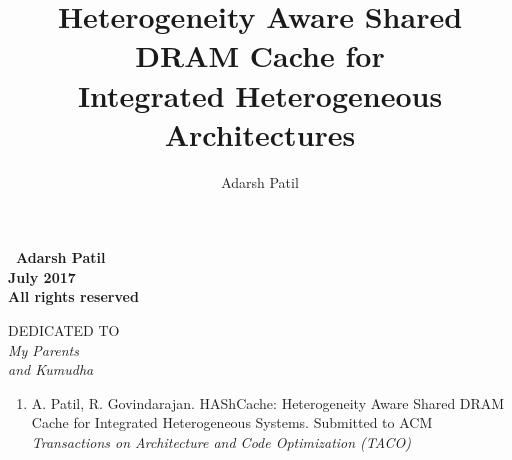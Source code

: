 \documentclass[12pt,twoside,a4paper, openright]{report}
\newcommand{\cachename}{HAShCache}
\begin{document}
\begin{frontmatter}
\title{Heterogeneity Aware Shared DRAM Cache for \\ Integrated Heterogeneous Architectures}
\author{Adarsh Patil}
\enggfaculty
\mscengg
\iisclogotrue %
\figurespagefalse %
\tablespagetrue %
\maketitle

\vspace*{\fill}
\vspace{10em}
\begin{center}
	\Large\bf \textcopyright \ Adarsh Patil\\
	\Large\bf July 2017\\
	\Large\bf All rights reserved
\end{center}
\vspace*{\fill}
\thispagestyle{empty}


\begin{dedication}
\newpage
\vspace*{\fill}
\begin{center}
	DEDICATED TO \\
	\Large\it My Parents  \\
	\Large\it and Kumudha
\end{center}
\vspace*{\fill}
\thispagestyle{empty}
\newpage
\thispagestyle{empty}
\end{dedication}


\acknowledgements
{}



\publications
\begin{enumerate}
	\item A. Patil, R. Govindarajan. \cachename: Heterogeneity Aware Shared DRAM Cache for Integrated Heterogeneous Systems. Submitted to ACM \textit{Transactions on Architecture and Code Optimization (TACO)}
\end{enumerate}



\begin{abstract}

\end{abstract}

\makecontents

	
\cleardoublepage
{}
\listoffigures

\newpage
{}
\listofalgorithms
\newpage
\thispagestyle{empty}
\cleardoublepage


\end{frontmatter}
















\end{document}
